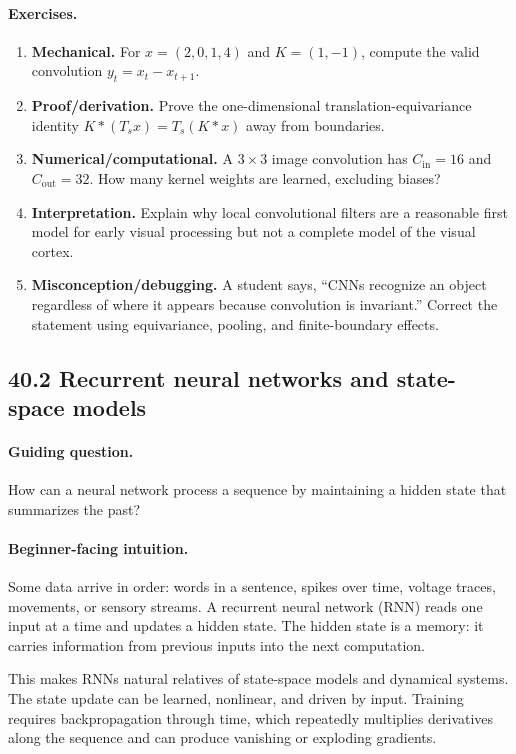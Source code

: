 \paragraph{Exercises.}
\begin{enumerate}[label=\textbf{40.1.\arabic*.}, leftmargin=*]
\item \textbf{Mechanical.} For \(x=(2,0,1,4)\) and \(K=(1,-1)\), compute the valid convolution \(y_t=x_t-x_{t+1}\).
\item \textbf{Proof/derivation.} Prove the one-dimensional translation-equivariance identity \(K\ast(T_s x)=T_s(K\ast x)\) away from boundaries.
\item \textbf{Numerical/computational.} A \(3\times3\) image convolution has \(C_{\mathrm{in}}=16\) and \(C_{\mathrm{out}}=32\). How many kernel weights are learned, excluding biases?
\item \textbf{Interpretation.} Explain why local convolutional filters are a reasonable first model for early visual processing but not a complete model of the visual cortex.
\item \textbf{Misconception/debugging.} A student says, ``CNNs recognize an object regardless of where it appears because convolution is invariant.'' Correct the statement using equivariance, pooling, and finite-boundary effects.
\end{enumerate}

\subsection{40.2 Recurrent neural networks and state-space models}

\paragraph{Guiding question.}
How can a neural network process a sequence by maintaining a hidden state that summarizes the past?

\paragraph{Beginner-facing intuition.}
Some data arrive in order: words in a sentence, spikes over time, voltage traces, movements, or sensory streams. A recurrent neural network (RNN) reads one input at a time and updates a hidden state. The hidden state is a memory: it carries information from previous inputs into the next computation.

This makes RNNs natural relatives of state-space models and dynamical systems. The state update can be learned, nonlinear, and driven by input. Training requires backpropagation through time, which repeatedly multiplies derivatives along the sequence and can produce vanishing or exploding gradients.

